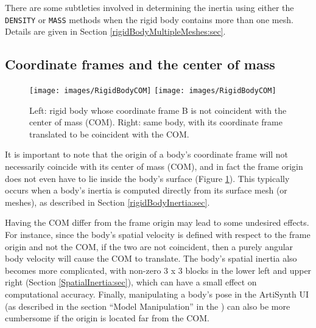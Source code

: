 \begin{sideblock}
There are some subtleties involved in determining the inertia using
either the {\tt DENSITY} or {\tt MASS} methods when the rigid body
contains more than one mesh. Details are given in Section
\ref{rigidBodyMultipleMeshes:sec}.
\end{sideblock}

\subsection{Coordinate frames and the center of mass}
\label{RigidBodyCOM:sec}

\begin{figure}[h]
\begin{center}
\iflatexml
 \texttt{[image: images/RigidBodyCOM]}
\else
 \texttt{[image: images/RigidBodyCOM]}
\fi
\end{center}
\caption{Left: rigid body whose coordinate frame B is not coincident
with the center of mass (COM). Right: same body, with its coordinate
frame translated to be coincident with the COM.}
\label{RigidBodyCOM:fig}
\end{figure}

It is important to note that the origin of a body's coordinate frame
will not necessarily coincide with its center of mass (COM), and in
fact the frame origin does not even have to lie inside the body's
surface (Figure \ref{RigidBodyCOM:fig}). This typically occurs when a
body's inertia is computed directly from its surface mesh (or meshes),
as described in Section \ref{rigidBodyInertia:sec}.

Having the COM differ from the frame origin may lead to some undesired
effects. For instance, since the body's spatial velocity is defined
with respect to the frame origin and not the COM, if the two are not
coincident, then a purely angular body velocity will cause the COM to
translate. The body's spatial inertia also becomes more complicated,
with non-zero 3 x 3 blocks in the lower left and upper right
(Section \ref{SpatialInertia:sec}), which can have a small effect on
computational accuracy. Finally, manipulating a body's pose in the
ArtiSynth UI (as described in the section ``Model Manipulation'' in
the \pdfbreak
{}) can
also be more cumbersome if the origin is located far from the COM.

